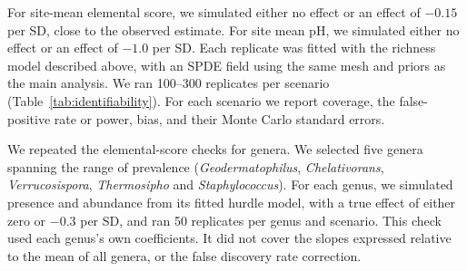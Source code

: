 \documentclass[11pt]{article}
\begin{document}
For site-mean elemental score, we simulated either no effect or an effect of $-0.15$ per SD, close to the observed estimate. For site mean pH, we simulated either no effect or an effect of $-1.0$ per SD. Each replicate was fitted with the richness model described above, with an SPDE field using the same mesh and priors as the main analysis. We ran 100--300 replicates per scenario (Table~\ref{tab:identifiability}). For each scenario we report coverage, the false-positive rate or power, bias, and their Monte Carlo standard errors.

We repeated the elemental-score checks for genera. We selected five genera spanning the range of prevalence (\textit{Geodermatophilus}, \textit{Chelativorans}, \textit{Verrucosispora}, \textit{Thermosipho} and \textit{Staphylococcus}). For each genus, we simulated presence and abundance from its fitted hurdle model, with a true effect of either zero or $-0.3$ per SD, and ran 50 replicates per genus and scenario. This check used each genus's own coefficients. It did not cover the slopes expressed relative to the mean of all genera, or the false discovery rate correction.

\end{document}
